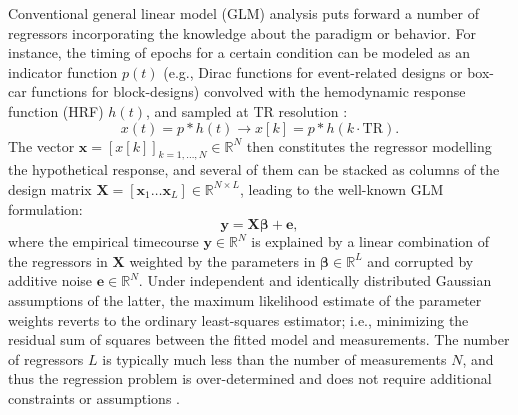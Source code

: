 Conventional general linear model (GLM) analysis puts forward a number of
regressors incorporating the knowledge about the paradigm or behavior. For
instance, the timing of epochs for a certain condition can be modeled as an
indicator function $p(t)$ (e.g., Dirac functions for event-related designs or
box-car functions for block-designs) convolved with the hemodynamic response
function (HRF) $h(t)$, and sampled at TR resolution
\citep{Friston1994AnalysisfunctionalMRI,Friston1998EventRelatedfMRI,
Boynton1996LinearSystemsAnalysis,Cohen1997ParametricAnalysisfMRI}:
$$
   x(t) = p*h(t) \rightarrow x[k] = p*h(k\cdot\text{TR}).
$$
The vector $\mathbf{x}=[x[k]]_{k=1,\ldots,N} \in \mathbb{R}^{N}$ then
constitutes the regressor modelling the hypothetical response, and several of
them can be stacked as columns of the design matrix $\mathbf{X}=[\mathbf{x}_1
\ldots \mathbf{x}_L] \in \mathbb{R}^{N \times L}$, leading to the well-known GLM
formulation: 
\begin{equation}
    \label{eq:glm}
    \mathbf{y} = \mathbf{X} \boldsymbol\beta + \mathbf{e},
\end{equation}
where the empirical timecourse $\mathbf{y} \in \mathbb{R}^{N}$ is explained by a
linear combination of the regressors in $\mathbf{X}$ weighted by the parameters
in $\boldsymbol\beta \in \mathbb{R}^{L}$ and corrupted by additive noise
$\mathbf{e}\in \mathbb{R}^{N}$. Under independent and identically distributed
Gaussian assumptions of the latter, the maximum likelihood estimate of the
parameter weights reverts to the ordinary least-squares estimator; i.e.,
minimizing the residual sum of squares between the fitted model and
measurements. The number of regressors $L$ is typically much less than the
number of measurements $N$, and thus the regression problem is over-determined
and does not require additional constraints or assumptions
\citep{HENSON2007178}.

